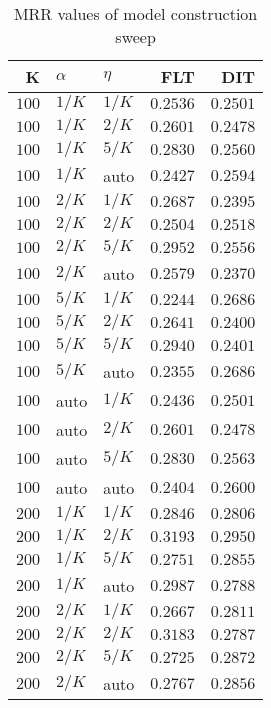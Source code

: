 
\begin{table}
\begin{spacing}{1.2}
\centering
\caption{MRR values of \mahout model construction sweep}
\label{table:mahout_model_sweep}
\vspace{0.2em}
\parbox{.45\linewidth}{\centering \begin{tabular}{rll|rr}
\toprule
    K &  $\alpha$ &    $\eta$ &      FLT &      DIT \\
\midrule
$100$ &  $1/K$ &  $1/K$ & $0.2536$ & $0.2501$ \\
$100$ &  $1/K$ &  $2/K$ & $0.2601$ & $0.2478$ \\
$100$ &  $1/K$ &  $5/K$ & $0.2830$ & $0.2560$ \\
$100$ &  $1/K$ &   auto & $0.2427$ & $0.2594$ \\
$100$ &  $2/K$ &  $1/K$ & $0.2687$ & $0.2395$ \\
$100$ &  $2/K$ &  $2/K$ & $0.2504$ & $0.2518$ \\
$100$ &  $2/K$ &  $5/K$ & $0.2952$ & $0.2556$ \\
$100$ &  $2/K$ &   auto & $0.2579$ & $0.2370$ \\
$100$ &  $5/K$ &  $1/K$ & $0.2244$ & $0.2686$ \\
$100$ &  $5/K$ &  $2/K$ & $0.2641$ & $0.2400$ \\
$100$ &  $5/K$ &  $5/K$ & $0.2940$ & $0.2401$ \\
$100$ &  $5/K$ &   auto & $0.2355$ & $0.2686$ \\
$100$ &   auto &  $1/K$ & $0.2436$ & $0.2501$ \\
$100$ &   auto &  $2/K$ & $0.2601$ & $0.2478$ \\
$100$ &   auto &  $5/K$ & $0.2830$ & $0.2563$ \\
$100$ &   auto &   auto & $0.2404$ & $0.2600$ \\
$200$ &  $1/K$ &  $1/K$ & $0.2846$ & $0.2806$ \\
$200$ &  $1/K$ &  $2/K$ & $0.3193$ & $0.2950$ \\
$200$ &  $1/K$ &  $5/K$ & $0.2751$ & $0.2855$ \\
$200$ &  $1/K$ &   auto & $0.2987$ & $0.2788$ \\
$200$ &  $2/K$ &  $1/K$ & $0.2667$ & $0.2811$ \\
$200$ &  $2/K$ &  $2/K$ & $0.3183$ & $0.2787$ \\
$200$ &  $2/K$ &  $5/K$ & $0.2725$ & $0.2872$ \\
$200$ &  $2/K$ &   auto & $0.2767$ & $0.2856$ \\

\end{tabular}}
\end{spacing}
\end{table}

